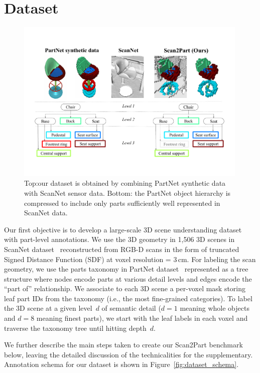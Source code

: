 \section{Dataset}
\label{sec:dataset}

\begin{figure}[!t]
\label{fig:dataset_teaser}
\centering
\includegraphics[width=0.99\textwidth]{Figures/scan2part/dataset_teaser.pdf}
\caption{Top:our dataset is obtained by combining PartNet synthetic data with ScanNet sensor data. Bottom: the PartNet object hierarchy is compressed to include only parts sufficiently well represented in ScanNet data.}
\end{figure}

Our first objective is to develop a large-scale 3D scene understanding dataset with part-level annotations. 
We use the 3D geometry in 1,506 3D scenes in ScanNet dataset~\cite{dai2017scannet} reconstructed from RGB-D scans in the form of truncated Signed Distance Function (SDF) at voxel resolution = 3\,cm.
For labeling the scan geometry, we use the parts taxonomy in PartNet dataset~\cite{mo2019partnet} represented as a tree structure where nodes encode parts at various detail levels and edges encode the ``part of'' relationship.
We associate to each 3D scene a per-voxel mask storing leaf part IDs from the taxonomy (i.e., the most fine-grained categories).
To label the 3D scene at a given level~$d$ of semantic detail ($d = 1$ meaning whole objects and $d = 8$ meaning finest parts), we start with the leaf labels in each voxel and traverse the taxonomy tree until hitting depth~$d$.



We further describe the main steps taken to create our Scan2Part benchmark below, leaving the detailed discussion of the technicalities for the supplementary. 
Annotation schema for our dataset is shown in Figure~\ref{fig:dataset_schema}.

